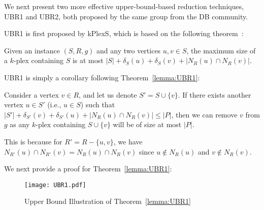 \documentclass[sigconf, nonacm]{acmart}
\begin{document}
\vspace{1mm}
We next present two more effective upper-bound-based reduction techniques, UBR1 and UBR2, both proposed by the same group from the DB community. 

UBR1 is first proposed by kPlexS, which is based on the following theorem~\cite{kPlexS}:

\begin{theorem}
  \label{lemma:UBR1}
   Given an instance $(S, R, g)$ and any two vertices $u, v\in S$, the maximum size of a $k$-plex containing $S$ is at most 
  \( |S|+\delta_S(u)+\delta_S(v)+|N_R(u)\cap N_R(v)| \).
\end{theorem}

UBR1 is simply a corollary following Theorem~\ref{lemma:UBR1}: 

\vspace{1mm}
 Consider a vertex $v\in R$, and let us denote $S'=S\cup\{v\}$. If there exists another vertex $u\in S'$ (i.e., $u\in S$) such that $|S'|+\delta_{S'}(v)+\delta_{S'}(u)+|N_R(u)\cap N_R(v)|\le |P|$, then we can remove $v$ from $g$ as any $k$-plex containing $S\cup\{v\}$ will be of size at most $|P|$. 

\vspace{1mm}
This is because for $R'=R-\{u, v\}$, we have $N_{R'}(u)\cap N_{R'}(v)=N_R(u)\cap N_R(v)$ since $u\notin N_R(u)$ and $v\notin N_R(v)$.

We next provide a proof for Theorem~\ref{lemma:UBR1}:

\begin{figure}[t]
  \texttt{[image: UBR1.pdf]}
  \caption{Upper Bound Illustration of Theorem~\ref{lemma:UBR1}}\label{fig:UBR1}
  \vspace{3mm}
\end{figure}
\end{document}
